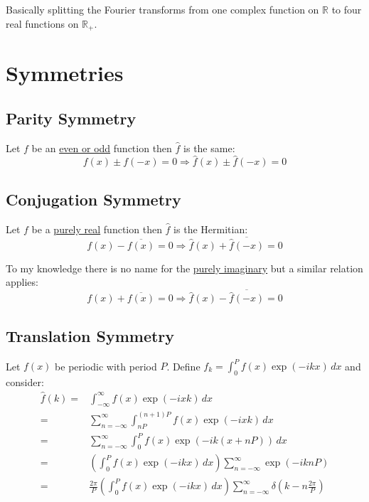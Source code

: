 Basically splitting the Fourier transforms from one complex function on $\mathbb{R}$ to four real functions on $\mathbb{R}_+$.

\section{Symmetries}
\subsection{Parity Symmetry}
\label{sec:parity-sym}
Let $f$ be an \hyperref[appx:real-img-odd-even]{even or odd} function then $\hat{f}$ is the same:
\[f(x)\pm f(-x) = 0 \Rightarrow \hat{f}(x)\pm\hat{f}(-x) = 0\]

\subsection{Conjugation Symmetry}
\label{sec:conjugation-sym}
Let $f$ be a \hyperref[appx:real-img-odd-even]{purely real} function then $\hat{f}$ is the Hermitian:
\[f(x) - \overline{f(x)} = 0 \Rightarrow \hat{f}(x)+\overline{\hat{f}(-x)} = 0\]

To my knowledge there is no name for the \hyperref[appx:real-img-odd-even]{purely imaginary} but a similar relation applies:
\[f(x) + \overline{f(x)} = 0 \Rightarrow \hat{f}(x)-\overline{\hat{f}(-x)} = 0\]

\subsection{Translation Symmetry}
Let $f(x)$ be periodic with period $P$.
Define $f_k = \int_{0}^{P}f(x)\exp(-ikx)\,dx$ and consider:
\begin{equation*}
\begin{aligned}
	\hat{f}(k) =& \int_{-\infty}^{\infty}f(x)\exp(-ixk)\,dx \\
	=& \sum_{n=-\infty}^{\infty}\int_{nP}^{(n+1)P}f(x)\exp(-ixk)\,dx \\
	=& \sum_{n=-\infty}^{\infty}\int_{0}^{P}f(x)\exp(-ik(x+nP))\,dx \\
	=& \left(\int_{0}^{P}f(x)\exp(-ikx)\,dx\right)\sum_{n=-\infty}^{\infty}\exp(-iknP) \\
	=& \frac{2\pi}{P}\left(\int_{0}^{P}f(x)\exp(-ikx)\,dx\right)\sum_{n=-\infty}^{\infty}\delta\left(k-n\frac{2\pi}{P}\right)\\
\end{aligned}
\end{equation*}

